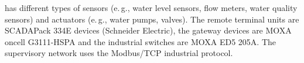 \documentclass[sigconf]{acmart}
\makeatletter
\newcommand{\eg}{e.\@\,g.,\@\xspace}
\newcommand{\giuseppe}[1]{\textcolor{green}{Giuseppe: #1}}
\makeatother
\begin{document}


\wadi has different types of sensors (\eg water level sensors, flow meters,
water quality sensors) and actuators (\eg water pumps, valves). The remote
terminal units are SCADAPack 334E devices (Schneider Electric), the gateway
devices are MOXA oncell G3111-HSPA and the industrial switches are MOXA ED5
205A. The \wadi supervisory network uses the Modbus/TCP industrial protocol.





\end{document}
